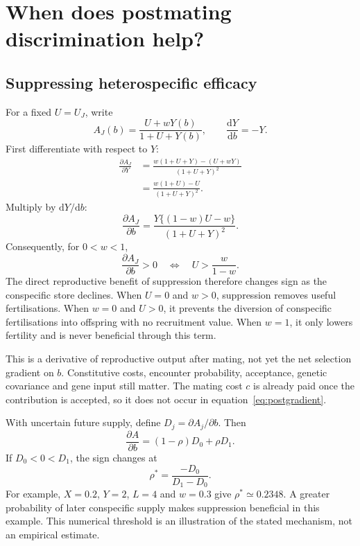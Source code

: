 \documentclass[11pt,a4paper]{article}
\newcommand{\dd}{\mathrm d}
\begin{document}
\section{When does postmating discrimination help?}
\subsection{Suppressing heterospecific efficacy}
For a fixed $U=U_J$, write
\begin{equation}
A_J(b)=\frac{U+wY(b)}{1+U+Y(b)},\qquad \frac{\dd Y}{\dd b}=-Y.
\end{equation}
First differentiate with respect to $Y$:
\begin{align}
\frac{\partial A_J}{\partial Y}
&=\frac{w(1+U+Y)-(U+wY)}{(1+U+Y)^2}\\
&=\frac{w(1+U)-U}{(1+U+Y)^2}.
\end{align}
Multiply by $\dd Y/\dd b$:
\begin{equation}
\boxed{\frac{\partial A_J}{\partial b}
=\frac{Y\{(1-w)U-w\}}{(1+U+Y)^2}.}
\label{eq:postgradient}
\end{equation}
Consequently, for $0<w<1$,
\begin{equation}
\frac{\partial A_J}{\partial b}>0
\quad\Longleftrightarrow\quad U>\frac{w}{1-w}.
\end{equation}
The direct reproductive benefit of suppression therefore changes sign as the conspecific store declines. When $U=0$ and $w>0$, suppression removes useful fertilisations. When $w=0$ and $U>0$, it prevents the diversion of conspecific fertilisations into offspring with no recruitment value. When $w=1$, it only lowers fertility and is never beneficial through this term.

This is a derivative of reproductive output after mating, not yet the net selection gradient on $b$. Constitutive costs, encounter probability, acceptance, genetic covariance and gene input still matter. The mating cost $c$ is already paid once the contribution is accepted, so it does not occur in equation~\eqref{eq:postgradient}.

With uncertain future supply, define $D_j=\partial A_j/\partial b$. Then
\begin{equation}
\frac{\partial A}{\partial b}=(1-\rho)D_0+\rho D_1.
\end{equation}
If $D_0<0<D_1$, the sign changes at
\begin{equation}
\rho^*=\frac{-D_0}{D_1-D_0}.
\end{equation}
For example, $X=0.2$, $Y=2$, $L=4$ and $w=0.3$ give $\rho^*\simeq0.2348$. A greater probability of later conspecific supply makes suppression beneficial in this example. This numerical threshold is an illustration of the stated mechanism, not an empirical estimate.
\end{document}
